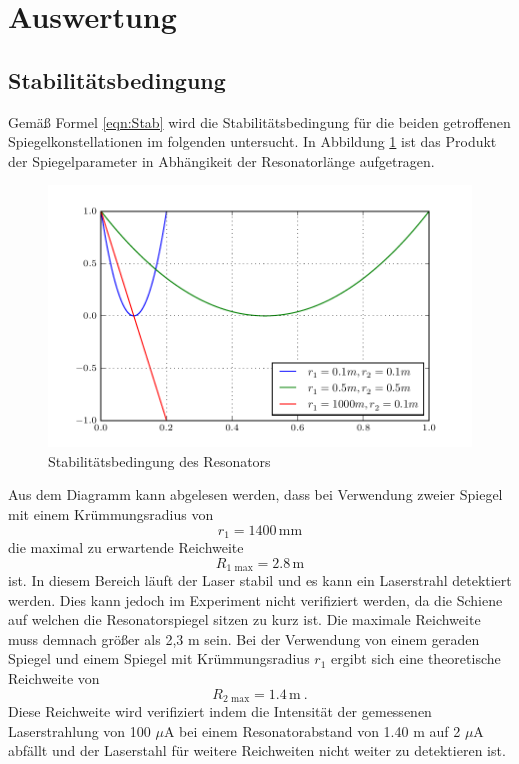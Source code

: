 \section{Auswertung}
\label{sec:Auswertung}

\subsection{Stabilitätsbedingung}
Gemäß Formel \ref{eqn:Stab} wird die Stabilitätsbedingung für die beiden getroffenen Spiegelkonstellationen im folgenden untersucht. In Abbildung \ref{fig:stabi} ist das Produkt der Spiegelparameter in Abhängikeit der Resonatorlänge aufgetragen.
\begin{figure}
  \centering
  \includegraphics[width=\textwidth]{Stabilisationsparameter.pdf}
  \caption{Stabilitätsbedingung des Resonators}
  \label{fig:stabi}
\end{figure}
Aus dem Diagramm kann abgelesen werden, dass bei Verwendung zweier Spiegel mit einem Krümmungsradius von
\begin{equation}
  r_1 = 1400 \, \text{mm}
  \label{eqn:rad1}
\end{equation}
die maximal zu erwartende Reichweite
\begin{equation}
  R_\text{1 max} = 2.8 \, \text{m}
  \label{eqn:rmax1}
\end{equation}
ist. In diesem Bereich läuft der Laser stabil und es kann ein Laserstrahl detektiert werden. Dies kann jedoch im Experiment nicht verifiziert werden, da die Schiene auf welchen die Resonatorspiegel sitzen zu kurz ist. Die maximale Reichweite muss demnach größer als 2,3 m sein. Bei der Verwendung von einem geraden Spiegel und einem Spiegel mit Krümmungsradius $r_1$ ergibt sich eine theoretische Reichweite von
\begin{equation}
  R_\text{2 max} = 1.4 \, \text{m} \ .
  \label{eqn:rmax2}
\end{equation}
Diese Reichweite wird verifiziert indem die Intensität der gemessenen Laserstrahlung von 100 $\mu$A bei einem Resonatorabstand von 1.40 m auf 2 $\mu$A abfällt und der Laserstahl für weitere Reichweiten nicht weiter zu detektieren ist.

